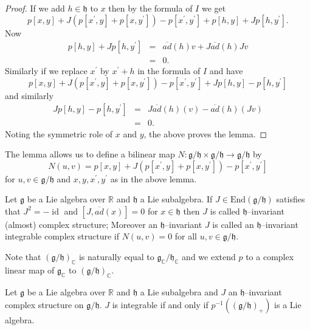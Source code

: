 \documentclass{amse-new}
\numberwithin{equation}{section} %
\begin{document}
\begin{proof}
If we add $h\in\mathfrak{h}$ to $x$ then by the formula of $I$ we get%
\[
p[x,y]+J(p[x^{\prime},y]+p[x,y^{\prime}])-p[x^{\prime},y^{\prime
}]+p[h,y]+Jp[h,y^{\prime}].
\]
Now%
\begin{eqnarray*}
p[h,y]+Jp[h,y^{\prime}]&=&\overline{ad}(h)v+J\overline{ad}(h)Jv\\
&=&0.
\end{eqnarray*}
Similarly if we replace $x^{\prime}$ by $x^{\prime}+h$ in the formula of $I$
and have%
\[
p[x,y]+J(p[x^{\prime},y]+p[x,y^{\prime}])-p[x^{\prime},y^{\prime
}]+Jp[h,y]-p[h,y^{\prime}]
\]
and similarly
\begin{eqnarray*}
Jp[h,y]-p[h,y^{\prime}]&=&J\overline{ad}(h)(v)-\overline{ad}(h)(J v)\\
&=&0.%
\end{eqnarray*}
Noting the symmetric role of $x$ and $y$, the above proves the lemma.
\end{proof}

The lemma allows us to define a bilinear map $N :\mathfrak{g}%
/\mathfrak{h\times g}/\mathfrak{h} \to \mathfrak{g}/\mathfrak{h}$ by
\[
N(u,v)=p[x,y]+J(p[x^{\prime},y]+p[x,y^{\prime}])-p[x^{\prime},y^{\prime}]
\]
for $u,v\in\mathfrak{g}/\mathfrak{h}$ and $x,y,x^{\prime},y^{\prime}$ as in
the above lemma.

\begin{definition}
\label{NDef}Let $\mathfrak{g}$ be a Lie algebra over $\mathbb{R}$ and
$\mathfrak{h}$ a Lie subalgebra. If $J\in\mathrm{End}(\mathfrak{g}%
/\mathfrak{h})$ satisfies that $J^{2}=-\operatorname{id}$ and $[J,\overline{ad}(x)]=0$ for
$x\in\mathfrak{h}$ then $J$ is called $\mathfrak{h}$--invariant (almost) complex structure;  Moreover an $\mathfrak{h}$--invariant $J$ is called
an $\mathfrak{h}$--invariant integrable complex structure if $N(u,v)=0$ for
all $u,v\in\mathfrak{g}/\mathfrak{h}$.
\end{definition}

Note that $\left(  \mathfrak{g}/\mathfrak{h}\right)  _{\mathbb{C}}$ is
naturally equal to $\mathfrak{g}_{\mathbb{C}}/\mathfrak{h}_{\mathbb{C}}$ and
we extend $p$ to a complex linear map of $\mathfrak{g}_{\mathbb{C}}$ to
$\left(  \mathfrak{g}/\mathfrak{h}\right)  _{\mathbb{C}}$.

\begin{lemma}
\label{lmm:12} Let $\mathfrak{g}$ be a Lie algebra over $\mathbb{R}$ and
$\mathfrak{h}$ a Lie subalgebra and $J$ an $\mathfrak{h}$--invariant complex
structure on $\mathfrak{g}/\mathfrak{h}$. $J$ is integrable if and only if
$p^{-1}(\left(  \mathfrak{g}/\mathfrak{h}\right)  _{+})$ is a Lie algebra.
\end{lemma}
\end{document}
